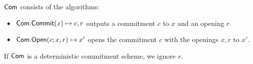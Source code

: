 %
%





\begin{definition}
	$ \mathsf{Com} $ consists of the algorithms:
	\begin{itemize}
		\item $ \mathsf{Com}.\mathsf{Commit}(x) \mapsto c,r$ outputs a commitment $ c $ to $ x $ and  an opening $ r $.
		\item $ \mathsf{Com}.\mathsf{Open}(c;x,r)  \mapsto x'$ opens the commitment $ c $ with the openings $ x,r$ to $ x' $. 
	\end{itemize}
\end{definition}

If $ \mathsf{Com} $ is a deterministic commitment scheme, we ignore $ r $.





